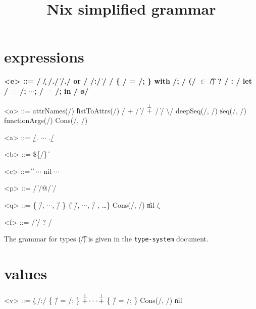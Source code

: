

\title{Nix simplified grammar}


\maketitle{}

\section{expressions}

\begin{grammar}
  \bfseries
  <e> ::=
    \x/ \| \c/
    \alt \e/.\a/ \| \e/.\a/ or \e/
    \alt \p/:\e/ \| \e/ \e/
    \alt \{ \e/ = \e/; \}
    \alt with \e/; \e/
    \alt (\e/ $\bm{\in}$ \t/) ? \e/ : \e/
    \alt let \x/ = \e/; $\cdots{}$; \x/ = \e/; in \e/
    \alt \o/

    <o> ::= attrNames(\e/) \| listToAttrs(\e/)
    \alt \e/ + \e/ \| \e/ $\overset{\bot}{+}$ \e/ \| \e/ \textbackslash \e/
    \alt deepSeq(\e/, \e/) \| seq(\e/, \e/)
    \alt functionArgs(\e/)
    \alt Cons(\e/, \e/)

  <a> ::= \b/. $\cdots{}$ .\b/

  <b> ::= \$\{\e/\} \| 

  <c> ::=  \|  \| $\cdots{}$
    \alt nil
    \alt $\cdots{}$

  <p> ::= \q/ \| \q/@\x/ \| \x/

  <q> ::= \{ \f/, $\cdots{}$, \f/ \} \| \{ \f/, $\cdots{}$, \f/ , \ldots{}\}
    \alt Cons(\x/, \x/) \| nil
    \alt \c/

  <f> ::= \x/ \| \x/ ? \e/

\end{grammar}

The grammar for types (\t/) is given in the \texttt{type-system} document.


\section{values}

\begin{grammar}
  \bfseries

  <v> ::=
    \c/
    \alt \p/:\e/
    \alt \{ \v/ = \e/; \} $\overset{\bot}{+} \cdots{} \overset{\bot}{+}$ \{ \v/ = \e/; \}
    \alt Cons(\e/, \e/) \| nil
\end{grammar}

